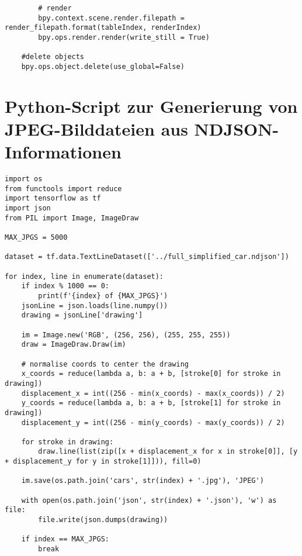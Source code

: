 \begin{lstlisting}
        # render
        bpy.context.scene.render.filepath = render_filepath.format(tableIndex, renderIndex)
        bpy.ops.render.render(write_still = True)

    #delete objects
    bpy.ops.object.delete(use_global=False)
\end{lstlisting}

\vfill
\pagebreak

\section{Python-Script zur Generierung von JPEG-Bilddateien aus NDJSON-Informationen}
\label{ndjsonpy}

\begin{lstlisting}
import os
from functools import reduce
import tensorflow as tf
import json
from PIL import Image, ImageDraw

MAX_JPGS = 5000

dataset = tf.data.TextLineDataset(['../full_simplified_car.ndjson'])

for index, line in enumerate(dataset):
    if index % 1000 == 0:
        print(f'{index} of {MAX_JPGS}')
    jsonLine = json.loads(line.numpy())
    drawing = jsonLine['drawing']

    im = Image.new('RGB', (256, 256), (255, 255, 255))
    draw = ImageDraw.Draw(im)

    # normalise coords to center the drawing
    x_coords = reduce(lambda a, b: a + b, [stroke[0] for stroke in drawing])
    displacement_x = int((256 - min(x_coords) - max(x_coords)) / 2)
    y_coords = reduce(lambda a, b: a + b, [stroke[1] for stroke in drawing])
    displacement_y = int((256 - min(y_coords) - max(y_coords)) / 2)

    for stroke in drawing:
        draw.line(list(zip([x + displacement_x for x in stroke[0]], [y + displacement_y for y in stroke[1]])), fill=0)

    im.save(os.path.join('cars', str(index) + '.jpg'), 'JPEG')

    with open(os.path.join('json', str(index) + '.json'), 'w') as file:
        file.write(json.dumps(drawing))

    if index == MAX_JPGS:
        break
\end{lstlisting}
